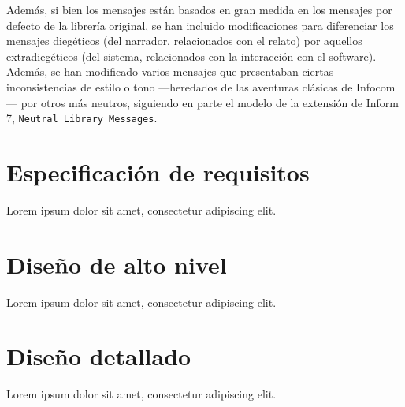 Además, si bien los mensajes están basados en gran medida en los mensajes por defecto de la librería original, se han incluido modificaciones para diferenciar los mensajes diegéticos (del narrador, relacionados con el relato) por aquellos extradiegéticos (del sistema, relacionados con la interacción con el software). Además, se han modificado varios mensajes que presentaban ciertas inconsistencias de estilo o tono ---heredados de las aventuras clásicas de Infocom--- por otros más neutros, siguiendo en parte el modelo de la extensión de Inform 7, \texttt{Neutral Library Messages}\cite{Reed:2007}.


\section{Especificación de requisitos}

Lorem ipsum dolor sit amet, consectetur adipiscing elit.


\section{Diseño de alto nivel}

Lorem ipsum dolor sit amet, consectetur adipiscing elit.


\section{Diseño detallado}

Lorem ipsum dolor sit amet, consectetur adipiscing elit.

